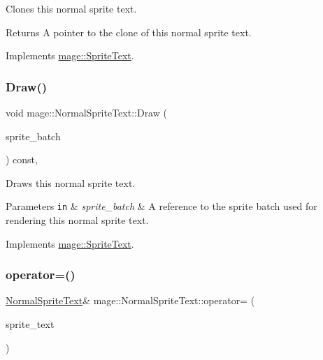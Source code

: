 Clones this normal sprite text.

\begin{DoxyReturn}{Returns}
A pointer to the clone of this normal sprite text. 
\end{DoxyReturn}


Implements \hyperlink{classmage_1_1_sprite_text_aa2c63346f5ad7f63f7a6d474df3556ef}{mage\+::\+Sprite\+Text}.

\hypertarget{classmage_1_1_normal_sprite_text_ad2a1b02bea18afd6bf61b106a727a355}{}\label{classmage_1_1_normal_sprite_text_ad2a1b02bea18afd6bf61b106a727a355} 
\subsubsection{\texorpdfstring{Draw()}{Draw()}}
{\footnotesize\ttfamily void mage\+::\+Normal\+Sprite\+Text\+::\+Draw (\begin{DoxyParamCaption}\item[{Sprite\+Batch \&}]{sprite\+\_\+batch }\end{DoxyParamCaption}) const\hspace{0.3cm}{\ttfamily [override]}, {\ttfamily [virtual]}}

Draws this normal sprite text.


\begin{DoxyParams}[1]{Parameters}
\mbox{\tt in}  & {\em sprite\+\_\+batch} & A reference to the sprite batch used for rendering this normal sprite text. \\
\hline
\end{DoxyParams}


Implements \hyperlink{classmage_1_1_sprite_text_a45d5ac8410d5a46b26e8491946a2ad9e}{mage\+::\+Sprite\+Text}.

\hypertarget{classmage_1_1_normal_sprite_text_ab7dbd2e71dcaef5d6b7b767afa8d7094}{}\label{classmage_1_1_normal_sprite_text_ab7dbd2e71dcaef5d6b7b767afa8d7094} 
\subsubsection{\texorpdfstring{operator=()}{operator=()}\hspace{0.1cm}{\footnotesize\ttfamily [1/2]}}
{\footnotesize\ttfamily \hyperlink{classmage_1_1_normal_sprite_text}{Normal\+Sprite\+Text}\& mage\+::\+Normal\+Sprite\+Text\+::operator= (\begin{DoxyParamCaption}\item[{const \hyperlink{classmage_1_1_normal_sprite_text}{Normal\+Sprite\+Text} \&}]{sprite\+\_\+text }\end{DoxyParamCaption})\hspace{0.3cm}{\ttfamily [delete]}}

